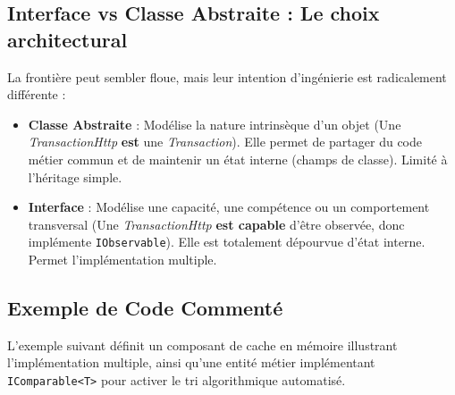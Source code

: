 \subsection{Interface vs Classe Abstraite : Le choix architectural}

La frontière peut sembler floue, mais leur intention d'ingénierie est radicalement différente :
\begin{itemize}
    \item \textbf{Classe Abstraite} : Modélise la nature intrinsèque d'un objet (Une \textit{TransactionHttp} \textbf{est} une \textit{Transaction}). Elle permet de partager du code métier commun et de maintenir un état interne (champs de classe). Limité à l'héritage simple.
    \item \textbf{Interface} : Modélise une capacité, une compétence ou un comportement transversal (Une \textit{TransactionHttp} \textbf{est capable} d'être observée, donc implémente \texttt{IObservable}). Elle est totalement dépourvue d'état interne. Permet l'implémentation multiple.
\end{itemize}

\subsection{Exemple de Code Commenté}

L'exemple suivant définit un composant de cache en mémoire illustrant l'implémentation multiple, ainsi qu'une entité métier implémentant \texttt{IComparable<T>} pour activer le tri algorithmique automatisé.

